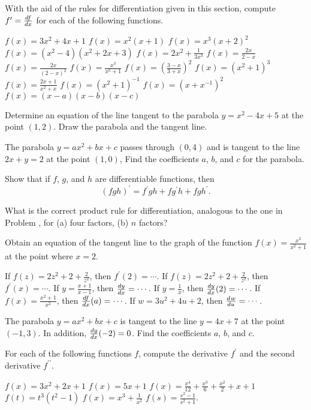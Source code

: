 \begin{exercises}

With the aid of the rules for differentiation given in this section,
compute $f^\prime = \frac{d f}{d x}$ for each of the following functions.
\begin{exenum}
\sx
$f(x) = 3x^2 + 4x + 1$
\sx
$f(x) = x^2 (x + 1)$
\sx
$f(x) = x^3 (x + 2)^2$
\sx
$f(x) = (x^2 - 4)(x^2 + 2x + 3)$
\sx
$f(x) = 2x^2 + \frac1{3x^3}$
\sx
$f(x) = \frac{2x}{2-x}$
\sx
$f(x) = \frac{2x}{(2-x)^2}$
\sx
$f(x) = \frac{x^3}{x^5 + 1}$
\sx
$f(x) = \left( \frac{3-x}{3+x} \right)^2$
\sx
$f(x) = (x^2 + 1)^3$
\sx
$f(x) = \frac{2x+1}{x^2+x}$
\sx
$f(x) = (x^2 + 1)^{-1}$
\sx
$f(x) = (x + x^{-1})^2$
\sx
$f(x) = (x-a)(x-b)(x-c)$
\end{exenum}

Determine an equation of the line tangent to the parabola
$y = x^2 - 4x + 5$ at the point $(1,2)$.
Draw the parabola and the tangent line.

The parabola $y = ax^2 + bx + c$ passes through $(0,4)$
and is tangent to the line $2x + y = 2$ at the point $(1, 0)$,
Find the coefficients $a$, $b$, and $c$ for the parabola.

Show that if $f$, $g$, and $h$ are differentiable functions, then
\[
(fgh)^\prime = f^\prime gh + fg^\prime h + fgh^\prime
.
\]

What is the correct product rule for differentiation, analogous
to the one in Problem , for (a) four factors, (b) $n$ factors?

Obtain an equation of the tangent line to the graph of the function
$f(x) = \frac{x^3}{x^2 + 1}$ at the point where $x = 2$.

\begin{exenum}
\sx
If $f(z) = 2z^2 + 2 + \frac2{z^2}$, then $f^\prime (2) = \cdots$.
\sx
If $f(z) = 2z^2 +2 + \frac2{z^2}$, then $f^\prime (x) = \cdots$.
\sx
If $y = \frac{x+1}{x-1}$, then $\frac{d y}{d x} = \cdots$.
\sx
If $y = \frac1x$, then $\frac{d y}{d x} (2) = \cdots$.
\sx
If $f(x) = \frac{x^2 + 1}{x^2}$, then $\frac{d f}{d x} (a) = \cdots$.
\sx
If $w = 3u^2 + 4u + 2$, then $\frac{d^{}{w}}{d{u}^{}} = \cdots$.
\end{exenum}

The parabola $y = ax^2 + bx + c$ is tangent to the line
$y = 4x + 7$ at the point $(-1, 3)$.
In addition, $\frac{d y}{d x} (-2) = 0$.  Find the coefficients $a$, $b$, and $c$.

For each of the following functions $f$, compute the derivative
$f^\prime$ and the second derivative $f^{\prime\prime}$.
\begin {exenum}
\sx
$f(x) = 3x^2 + 2x + 1$
\sx
$f(x) = 5x + 1$
\sx
$f(x) = \frac{x^4}{12} + \frac{x^3}6 + \frac{x^2}2 + x + 1$
\sx
$f(t) = t^3(t^2 - 1)$
\sx
$f(x) = x^3 + \frac1{x^2}$
\sx
$f(s) = \frac{s^2 - 1}{s^2 + 1}$.
\end{exenum}


\end{exercises}
